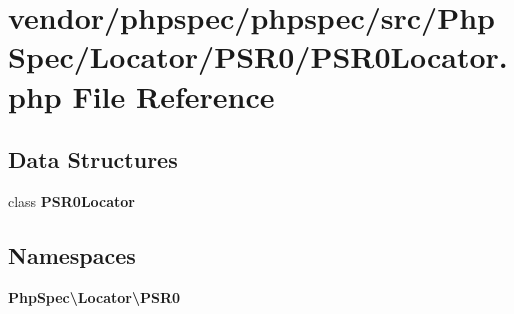 \section{vendor/phpspec/phpspec/src/\+Php\+Spec/\+Locator/\+P\+S\+R0/\+P\+S\+R0\+Locator.php File Reference}
\label{_p_s_r0_locator_8php}
\subsection*{Data Structures}
\begin{DoxyCompactItemize}
\item 
class {\bf P\+S\+R0\+Locator}
\end{DoxyCompactItemize}
\subsection*{Namespaces}
\begin{DoxyCompactItemize}
\item 
 {\bf Php\+Spec\textbackslash{}\+Locator\textbackslash{}\+P\+S\+R0}
\end{DoxyCompactItemize}
